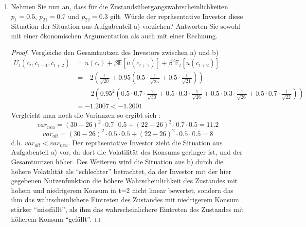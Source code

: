 \documentclass[12pt]{extreport} %
\theoremstyle{named}
\theoremstyle{nnamed}
\theoremstyle{itshape}
\theoremstyle{normal}
\begin{document}
\begin{enumerate}
\begin{proof}
\begin{align*}
						& = -2 \left( \frac{1}{\sqrt{20}} + 0.95 \left( 0.5 \cdot \frac{1}{\sqrt{25}} + 0.5 \cdot \frac{1}{\sqrt{21}} \right)\right) \\
						& \quad-2 \left( 0.95^2 \left( 0.25 \cdot \frac{1}{\sqrt{30}} + 0.25 \cdot \frac{1}{\sqrt{26}} + 0.25 \cdot \frac{1}{\sqrt{26}} + 0.25 \cdot \frac{1}{\sqrt{22}} \right)  \right) \\
						& = - 1.2001
			\end{align*} 
	\end{proof}
	\item Nehmen Sie nun an, dass für die Zustandsübergangswahrscheinlichkeiten $p_1 = 0.5$, $p_{21} = 0.7$ und $p_{22} = 0.3$ gilt. Würde der repräsentative Investor diese Situation der Situation aus Aufgabenteil a) vorziehen? Antworten Sie sowohl mit einer ökonomischen Argumentation als auch mit einer Rechnung.
		\begin{proof}
		Vergleiche den Gesamtnutzen des Investors zwischen a) und b)
				\begin{align*}
				U_t(c_t, c_{t+1}, c_{t+2}) & = u(c_t) + \beta \mathbb{E}[ u(c_{t+1})] + \beta^2 \mathbb{E}_t \left[ u(c_{t+2}) \right] \\
						& = -2 \left( \frac{1}{\sqrt{20}} + 0.95 \left( 0.5 \cdot \frac{1}{\sqrt{25}} + 0.5 \cdot \frac{1}{\sqrt{21}} \right)\right) \\
						& \quad-2 \left( 0.95^2 \left( 0.5 \cdot 0.7 \cdot \frac{1}{\sqrt{30}} + 0.5 \cdot 0.3 \cdot \frac{1}{\sqrt{26}} + 0.5 \cdot 0.3 \cdot \frac{1}{\sqrt{26}} + 0.5 \cdot 0.7 \cdot \frac{1}{\sqrt{22}} \right)  \right) \\
						& = - 1.2007 < -1.2001
			\end{align*} 		
			Vergleicht man noch die Varianzen so ergibt sich :
			$$ var_{neu} = (30-26)^2 \cdot 0.7 \cdot 0.5 + (22 - 26)^2 \cdot 0.7 \cdot 0.5 = 11.2 $$
			$$ var_{alt} = (30 - 26)^2 \cdot 0.5 \cdot 0.5 + (22 - 26)^2 \cdot 0.5 \cdot 0.5 = 8 $$
			d.h. $var_{alt}<var_{neu}$. Der repräsentative Investor zieht die Situation aus Aufgabenteil a) vor, da dort die Volatilität des Konsums geringer ist, und der Gesamtnutzen höher. Des Weiteren wird die Situation aus b) durch die höhere Volatilität als \enquote{schlechter} betrachtet, da der Investor mit der hier gegebenen Nutzenfunktion die höhere Wahrscheinlichkeit des Zustandes mit hohem und niedrigerem Konsum in t=2 nicht linear bewertet, sondern das ihm das wahrscheinlichere Eintreten des Zustandes mit  niedrigerem Konsum  stärker \enquote{missfällt}, als ihm das wahrscheinlichere Eintreten des Zustandes mit höherem Konsum \enquote{gefällt}. 

\end{proof}
\end{enumerate}
\end{document}
